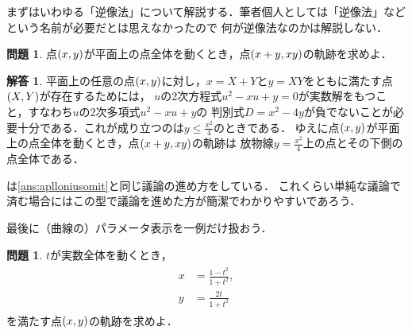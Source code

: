 \documentclass[11pt,a4paper]{ltjsarticle}
\newcommand*{\coord}[1]{\paren{#1}}
\theoremstyle{definition}
\newtheorem{que}[dfn]{問題}
\newtheorem{ans}[dfn]{解答}
\begin{document}
まずはいわゆる「逆像法」について解説する．筆者個人としては「逆像法」などという名前が必要だとは思えなかったので
何が逆像法なのかは解説しない．

\begin{que} \label{que:invimage}
  点$\coord{x,y}$が平面上の点全体を動くとき，点$\coord{x+y, xy}$の軌跡を求めよ．
\end{que}

\begin{ans} \label{ans:invimage}
  平面上の任意の点$\coord{x,y}$に対し，$x = X + Y$と$y = XY$をともに満たす点$\coord{X,Y}$が存在するためには，
  $u$の2次方程式$u^2 - xu + y = 0$が実数解をもつこと，すなわち$u$の2次多項式$u^2 - xu + y$の
  判別式$D = x^2 - 4y$が負でないことが必要十分である．これが成り立つのは$y \leq \frac{x^2}{4}$のときである．
  ゆえに点$\coord{x, y}$が平面上の点全体を動くとき，点$\coord{x+y, xy}$の軌跡は
  放物線$y = \frac{x^2}{4}$上の点とその下側の点全体である．
\end{ans}

は\cref{ans:aplloniusomit}と同じ議論の進め方をしている．
これくらい単純な議論で済む場合にはこの型で議論を進めた方が簡潔でわかりやすいであろう．

最後に（曲線の）パラメータ表示を一例だけ扱おう．

\begin{que} \label{que:parameter}
  $t$が実数全体を動くとき，
  \begin{align}
    \begin{aligned}
      x & = \frac{1 - t^2}{1 + t^2}, \\
      y & = \frac{2t}{1 + t^2}
    \end{aligned}
    \label{eq:parameter}
  \end{align}
  を満たす点$\coord{x, y}$の軌跡を求めよ．
\end{que}
\end{document}
